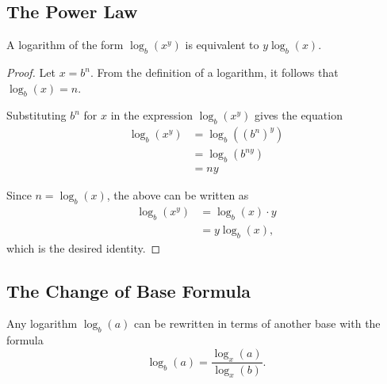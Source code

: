 \documentclass[parskip]{scrartcl}
\begin{document}
\subsection{The Power Law}

\begin{theorem}
  A logarithm of the form \(\log_{b}(x^{y})\) is equivalent to \(y\log_{b}(x)\).
\end{theorem}

\begin{proof}
  Let \(x = b^{n}\). From the definition of a logarithm, it follows that
  \(\log_{b}(x) = n\).

  Substituting \(b^{n}\) for \(x\) in the expression \(\log_{b}(x^{y})\) gives
  the equation
  \begin{equation*}
    \begin{split}
      \log_{b}(x^{y}) &= \log_{b}({(b^{n})}^{y}) \\
      &= \log_{b}(b^{ny}) \\
      &= ny
    \end{split}
  \end{equation*}

  Since \(n = \log_{b}(x)\), the above can be written as
  \begin{equation*}
    \begin{split}
      \log_{b}(x^{y}) &= \log_{b}(x) · y \\
      &= y\log_{b}(x),
    \end{split}
  \end{equation*}
  which is the desired identity.
\end{proof}

\subsection{The Change of Base Formula}

\begin{theorem}
  Any logarithm \(\log_{b}(a)\) can be rewritten in terms of another base with
  the formula
  \[ \log_{b}(a) = \frac{\log_{x}(a)}{\log_{x}(b)}. \]
\end{theorem}
\end{document}
